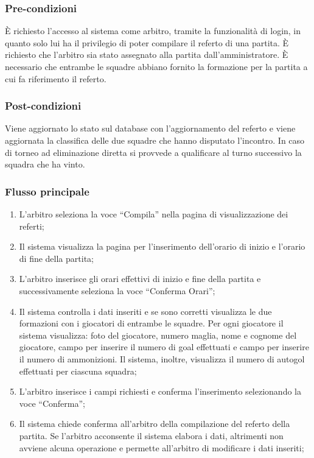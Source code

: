 \subsubsection*{Pre-condizioni}
È richiesto l'accesso al sistema come arbitro, tramite la funzionalità di login, in quanto solo lui ha il privilegio di poter compilare il referto di una partita. È richiesto che l'arbitro sia stato assegnato alla partita dall'amministratore. È necessario che entrambe le squadre abbiano fornito la formazione per la partita a cui fa riferimento il referto.

\subsubsection*{Post-condizioni}
Viene aggiornato lo stato sul database con l'aggiornamento del referto e viene aggiornata la classifica delle due squadre che hanno disputato l'incontro. In caso di torneo ad eliminazione diretta si provvede a qualificare al turno successivo la squadra che ha vinto.

\subsubsection*{Flusso principale}

\begin{enumerate}
	
	\item
	L'arbitro seleziona la voce ``Compila'' nella pagina di visualizzazione dei referti;
	
	\item
	Il sistema visualizza la pagina per l'inserimento dell'orario di inizio e l'orario di fine della partita;
	
	\item
	L'arbitro inserisce gli orari effettivi di inizio e fine della partita e successivamente seleziona la voce ``Conferma Orari'';
	
	\item
	Il sistema controlla i dati inseriti e se sono corretti visualizza le due formazioni con i giocatori di entrambe le squadre. Per ogni giocatore il sistema visualizza: foto del giocatore, numero maglia, nome e cognome del giocatore, campo per inserire il numero di goal effettuati e campo per inserire il numero di ammonizioni. Il sistema, inoltre, visualizza il numero di autogol effettuati per ciascuna squadra;
	
	\item
	L'arbitro inserisce i campi richiesti e conferma l'inserimento selezionando la voce ``Conferma'';
	
	\item
	Il sistema chiede conferma all'arbitro della compilazione del referto della partita. Se l'arbitro acconsente il sistema elabora i dati, altrimenti non avviene alcuna operazione e permette all'arbitro di modificare i dati inseriti;
	
\end{enumerate}

